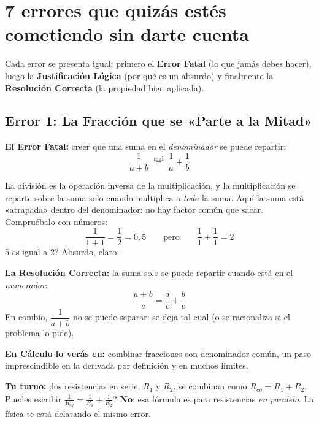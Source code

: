 \documentclass[12pt, letterpaper]{article}
\begin{document}
\section{7 errores que quizás estés cometiendo sin darte cuenta}

Cada error se presenta igual: primero el \textbf{Error Fatal} (lo que jamás debes hacer), luego la \textbf{Justificación Lógica} (por qué es un absurdo) y finalmente la \textbf{Resolución Correcta} (la propiedad bien aplicada).

\subsection{Error 1: La Fracción que se «Parte a la Mitad»}

\begin{cuadroadvertencia}
  \textbf{El Error Fatal:} creer que una suma en el \emph{denominador} se puede repartir:
  \[
    \frac{1}{a + b} \;\overset{\text{mal}}{=}\; \frac{1}{a} + \frac{1}{b}
  \]
\end{cuadroadvertencia}

La división es la operación inversa de la multiplicación, y la multiplicación se reparte sobre la suma solo cuando multiplica a \emph{toda} la suma. Aquí la suma está «atrapada» dentro del denominador: no hay factor común que sacar. Compruébalo con números:
\[
  \frac{1}{1 + 1} = \frac{1}{2} = 0{,}5 \qquad \text{pero} \qquad \frac{1}{1} + \frac{1}{1} = 2
\]
5 es igual a 2? Absurdo, claro.

\begin{cuadrosolucion}
  \textbf{La Resolución Correcta:} la suma solo se puede repartir cuando está en el \emph{numerador}:
  \[
    \frac{a + b}{c} = \frac{a}{c} + \frac{b}{c}
  \]
  En cambio, $\dfrac{1}{a + b}$ no se puede separar: se deja tal cual (o se racionaliza si el problema lo pide).
\end{cuadrosolucion}

\noindent\textbf{En Cálculo lo verás en:} combinar fracciones con denominador común, un paso imprescindible en la derivada por definición y en muchos límites.

\noindent\textbf{Tu turno:} dos resistencias en serie, $R_1$ y $R_2$, se combinan como $R_{eq} = R_1 + R_2$. \textquestiondown Puedes escribir $\frac{1}{R_{eq}} = \frac{1}{R_1} + \frac{1}{R_2}$? \textbf{No}: esa fórmula es para resistencias \emph{en paralelo}. La física te está delatando el mismo error.
\end{document}
